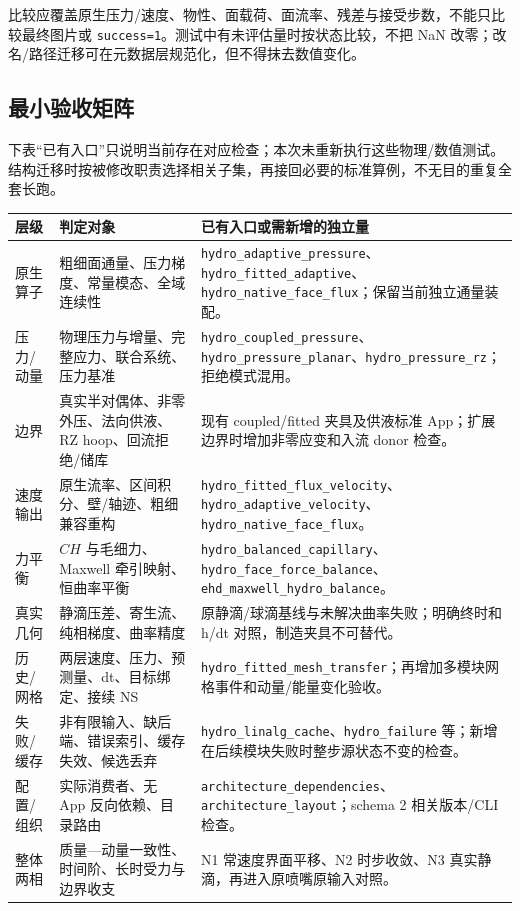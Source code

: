 \documentclass[UTF8,a4paper,11pt,fontset=fandol]{ctexart}
\newcommand{\code}[1]{\nolinkurl{#1}}
\begin{document}
比较应覆盖原生压力/速度、物性、面载荷、面流率、残差与接受步数，不能只比较最终图片或 \code{success=1}。测试中有未评估量时按状态比较，不把 NaN 改零；改名/路径迁移可在元数据层规范化，但不得抹去数值变化。

\subsection{最小验收矩阵}
下表“已有入口”只说明当前存在对应检查；本次未重新执行这些物理/数值测试。结构迁移时按被修改职责选择相关子集，再接回必要的标准算例，不无目的重复全套长跑。
\begin{longtable}{@{}P{.19\textwidth}P{.34\textwidth}P{.41\textwidth}@{}}
\toprule 层级 & 判定对象 & 已有入口或需新增的独立量\\\midrule\endhead
原生算子 & 粗细面通量、压力梯度、常量模态、全域连续性 & \code{hydro_adaptive_pressure}、\code{hydro_fitted_adaptive}、\code{hydro_native_face_flux}；保留当前独立通量装配。\\
压力/动量 & 物理压力与增量、完整应力、联合系统、压力基准 & \code{hydro_coupled_pressure}、\code{hydro_pressure_planar}、\code{hydro_pressure_rz}；拒绝模式混用。\\
边界 & 真实半对偶体、非零外压、法向供液、RZ hoop、回流拒绝/储库 & 现有 coupled/fitted 夹具及供液标准 App；扩展边界时增加非零应变和入流 donor 检查。\\
速度输出 & 原生流率、区间积分、壁/轴迹、粗细兼容重构 & \code{hydro_fitted_flux_velocity}、\code{hydro_adaptive_velocity}、\code{hydro_native_face_flux}。\\
力平衡 & $C H$ 与毛细力、Maxwell 牵引映射、恒曲率平衡 & \code{hydro_balanced_capillary}、\code{hydro_face_force_balance}、\code{ehd_maxwell_hydro_balance}。\\
真实几何 & 静滴压差、寄生流、纯相梯度、曲率精度 & 原静滴/球滴基线与未解决曲率失败；明确终时和 h/dt 对照，制造夹具不可替代。\\
历史/网格 & 两层速度、压力、预测量、dt、目标绑定、接续 NS & \code{hydro_fitted_mesh_transfer}；再增加多模块网格事件和动量/能量变化验收。\\
失败/缓存 & 非有限输入、缺后端、错误索引、缓存失效、候选丢弃 & \code{hydro_linalg_cache}、\code{hydro_failure} 等；新增在后续模块失败时整步源状态不变的检查。\\
配置/组织 & 实际消费者、无 App 反向依赖、目录路由 & \code{architecture_dependencies}、\code{architecture_layout}；schema 2 相关版本/CLI 检查。\\
整体两相 & 质量—动量一致性、时间阶、长时受力与边界收支 & N1 常速度界面平移、N2 时步收敛、N3 真实静滴，再进入原喷嘴原输入对照。\\
\bottomrule
\end{longtable}
\end{document}
